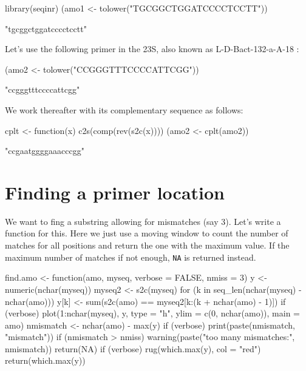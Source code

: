 \documentclass{article}
\begin{document}
\begin{Schunk}
\begin{Sinput}
 library(seqinr)
 (amo1 <- tolower("TGCGGCTGGATCCCCTCCTT"))
\end{Sinput}
\begin{Soutput}
[1] "tgcggctggatcccctcctt"
\end{Soutput}
\end{Schunk}


Let's use the following primer in the 23S, also known as 
L-D-Bact-132-a-A-18 \cite{RanjardL2000}:

\begin{Schunk}
\begin{Sinput}
 (amo2 <- tolower("CCGGGTTTCCCCATTCGG"))
\end{Sinput}
\begin{Soutput}
[1] "ccgggtttccccattcgg"
\end{Soutput}
\end{Schunk}

We work thereafter with its complementary sequence as follows:

\begin{Schunk}
\begin{Sinput}
 cplt <- function(x) c2s(comp(rev(s2c(x))))
 (amo2 <- cplt(amo2))
\end{Sinput}
\begin{Soutput}
[1] "ccgaatggggaaacccgg"
\end{Soutput}
\end{Schunk}

\section{Finding a primer location}

We want to fing a substring allowing for mismatches (say 3). Let's
write a function for this. Here we just use a moving window to count the
number of matches for all positions and return the one with the
maximum value. If the maximum number of matches if not enough, \texttt{NA}
is returned instead.

\begin{Schunk}
\begin{Sinput}
 find.amo <- function(amo, myseq, verbose = FALSE, nmiss = 3) {
     y <- numeric(nchar(myseq))
     myseq2 <- s2c(myseq)
     for (k in seq_len(nchar(myseq) - nchar(amo))) {
         y[k] <- sum(s2c(amo) == myseq2[k:(k + nchar(amo) - 
             1)])
     }
     if (verbose) 
         plot(1:nchar(myseq), y, type = "h", ylim = c(0, nchar(amo)), 
             main = amo)
     nmismatch <- nchar(amo) - max(y)
     if (verbose) 
         print(paste(nmismatch, "mismatch"))
     if (nmismatch > nmiss) {
         warning(paste("too many mismatches:", nmismatch))
         return(NA)
     }
     if (verbose) 
         rug(which.max(y), col = "red")
     return(which.max(y))
 }
\end{Sinput}
\end{Schunk}
\end{document}
